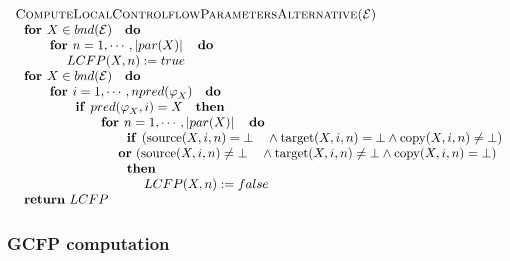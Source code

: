 \begin{equation*}
\begin{tabular}{l}
\textsc{ComputeLocalControlflowParametersAlternative(}$\mathcal{E}$\textsc{)}
\\ 
$\text{\textbf{for }}X\in bnd(\mathcal{E})\text{ \textbf{do}}$ \\ 
$\qquad \text{\textbf{for }}n=1,\cdots ,\left\vert par(X)\right\vert \text{ 
\textbf{do}}$ \\ 
$\qquad \qquad LCFP(X,n):=true$ \\ 
$\text{\textbf{for }}X\in bnd(\mathcal{E})\text{ \textbf{do}}$ \\ 
$\qquad \text{\textbf{for }}i=1,\cdots ,npred(\varphi _{X})\text{ \textbf{do}%
}$ \\ 
$\qquad \qquad \text{\textbf{if }}pred(\varphi _{X},i)=X\text{ \textbf{then}}
$ \\ 
$\qquad \qquad \qquad \text{\textbf{for }}n=1,\cdots ,\left\vert
par(X)\right\vert \text{ \textbf{do}}$ \\ 
$\qquad \qquad \qquad \qquad \text{\textbf{if }}(\mathrm{source}(X,i,n)=\bot 
\text{ }\wedge \mathrm{target}(X,i,n)=\bot \wedge \mathrm{copy}(X,i,n)\neq
\bot )$ \\ 
$\qquad \qquad \qquad \qquad $\textbf{or} $(\mathrm{source}(X,i,n)\neq \bot 
\text{ }\wedge \mathrm{target}(X,i,n)\neq \bot \wedge \mathrm{copy}%
(X,i,n)=\bot )$ \\ 
$\qquad \qquad \qquad \qquad \text{\textbf{then}}$ \\ 
$\qquad \qquad \qquad \qquad \qquad LCFP(X,n):=false$ \\ 
$\text{\textbf{return} }LCFP$%
\end{tabular}%
\end{equation*}

\subsubsection{GCFP computation}

